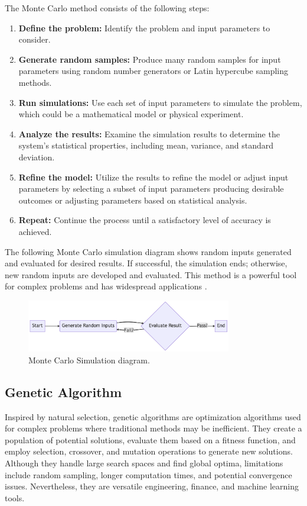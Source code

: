 The Monte Carlo method consists of the following steps:

\vspace{2mm}
\begin{enumerate}
    \item \textbf{Define the problem:} Identify the problem and input parameters to consider.
    \item \textbf{Generate random samples:} Produce many random samples for input parameters using random number generators or Latin hypercube sampling methods.
    \item \textbf{Run simulations:} Use each set of input parameters to simulate the problem, which could be a mathematical model or physical experiment.
    \item \textbf{Analyze the results:} Examine the simulation results to determine the system's statistical properties, including mean, variance, and standard deviation.
    \item \textbf{Refine the model:} Utilize the results to refine the model or adjust input parameters by selecting a subset of input parameters producing desirable outcomes or adjusting parameters based on statistical analysis.
    \item \textbf{Repeat:} Continue the process until a satisfactory level of accuracy is achieved.
\end{enumerate}
\vspace{3mm}

The following Monte Carlo simulation diagram shows random inputs generated and evaluated for desired results. If successful, the simulation ends; otherwise, new random inputs are developed and evaluated. This method is a powerful tool for complex problems and has widespread applications \cite{kroese2014monte}.

\begin{figure}[!htb]
    \centering
    \includegraphics[width=0.8\textwidth]{images/situational_theoretical_analysis/monte_carlo_simulation.png}
    \caption{Monte Carlo Simulation diagram.}
    \label{fig:monte_carlo_simulation}
\end{figure}


\subsection{Genetic Algorithm}
Inspired by natural selection, genetic algorithms are optimization algorithms used for complex problems where traditional methods may be inefficient. They create a population of potential solutions, evaluate them based on a fitness function, and employ selection, crossover, and mutation operations to generate new solutions. Although they handle large search spaces and find global optima, limitations include random sampling, longer computation times, and potential convergence issues. Nevertheless, they are versatile engineering, finance, and machine learning tools.

